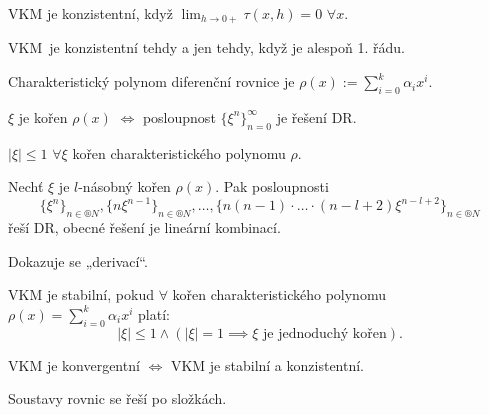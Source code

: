 \documentclass[12pt]{article}					%
\begin{document}
	\begin{definice}
		VKM je konzistentní, když $\lim_{h \rightarrow 0+} \tau(x, h) = 0$ $\forall x$.
	\end{definice}

	\begin{lemma}
		VKM je konzistentní tehdy a jen tehdy, když je alespoň 1. řádu.
	\end{lemma}

	\begin{definice}
		Charakteristický polynom diferenční rovnice je $\rho(x) := \sum_{i=0}^k \alpha_i x^i$.
	\end{definice}

	\begin{lemma}
		$\xi$ je kořen $\rho(x)$ $\Leftrightarrow$ posloupnost $\{\xi^n\}_{n=0}^∞$ je řešení DR.
	\end{lemma}

	\begin{poznamka}
		$|\xi| ≤ 1$ $\forall \xi$ kořen charakteristického polynomu $\rho$.
	\end{poznamka}

	\begin{lemma}
		Nechť $\xi$ je $l$-násobný kořen $\rho(x)$. Pak posloupnosti
		$$ \{\xi^n\}_{n \in ®N}, \{n \xi^{n-1}\}_{n \in ®N}, …, \{n(n-1)·…·(n - l + 2)\xi^{n - l + 2}\}_{n \in ®N} $$
		řeší DR, obecné řešení je lineární kombinací.

		\begin{dukazin}
			Dokazuje se „derivací“.
		\end{dukazin}
	\end{lemma}

	\begin{definice}
		VKM je stabilní, pokud $\forall$ kořen charakteristického polynomu $\rho(x) = \sum_{i=0}^k \alpha_i x^i$ platí:
		$$ |\xi| ≤ 1 \land (|\xi| = 1 \implies \xi \text{ je jednoduchý kořen}). $$
	\end{definice}

	\begin{veta}[?]
		VKM je konvergentní $\Leftrightarrow$ VKM je stabilní a konzistentní.
	\end{veta}

	\begin{poznamka}
		Soustavy rovnic se řeší po složkách.
	\end{poznamka}
\end{document}
